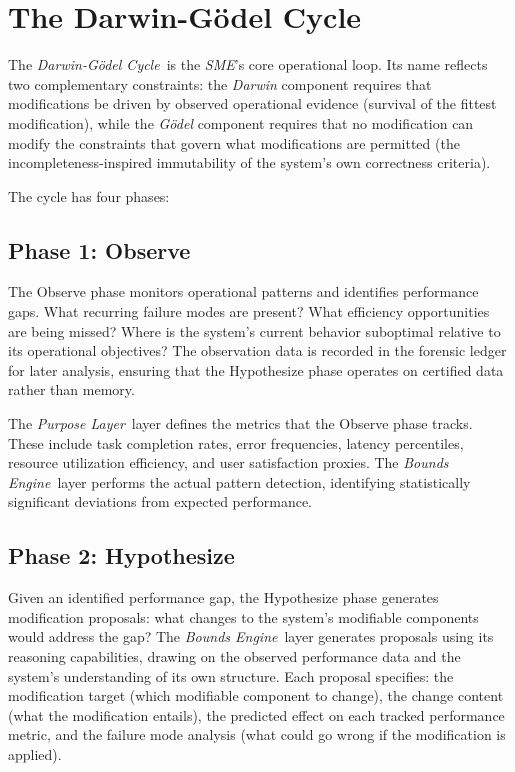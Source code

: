 \documentclass[12pt]{article}
\newcommand{\purpose}{\textit{Purpose Layer}}
\newcommand{\bounds}{\textit{Bounds Engine}}
\newcommand{\sme}{\textit{SME}}
\newcommand{\dgcycle}{\textit{Darwin-G\"odel Cycle}}
\begin{document}
\section{The Darwin-G\"odel Cycle}
\label{sec:dg-cycle}

The \dgcycle\ is the \sme's core operational loop. Its name reflects two complementary constraints: the \textit{Darwin} component requires that modifications be driven by observed operational evidence (survival of the fittest modification), while the \textit{G\"odel} component requires that no modification can modify the constraints that govern what modifications are permitted (the incompleteness-inspired immutability of the system's own correctness criteria).

The cycle has four phases:

\subsection{Phase 1: Observe}
The Observe phase monitors operational patterns and identifies performance gaps. What recurring failure modes are present? What efficiency opportunities are being missed? Where is the system's current behavior suboptimal relative to its operational objectives? The observation data is recorded in the forensic ledger for later analysis, ensuring that the Hypothesize phase operates on certified data rather than memory.

The \purpose\ layer defines the metrics that the Observe phase tracks. These include task completion rates, error frequencies, latency percentiles, resource utilization efficiency, and user satisfaction proxies. The \bounds\ layer performs the actual pattern detection, identifying statistically significant deviations from expected performance.

\subsection{Phase 2: Hypothesize}
Given an identified performance gap, the Hypothesize phase generates modification proposals: what changes to the system's modifiable components would address the gap? The \bounds\ layer generates proposals using its reasoning capabilities, drawing on the observed performance data and the system's understanding of its own structure. Each proposal specifies: the modification target (which modifiable component to change), the change content (what the modification entails), the predicted effect on each tracked performance metric, and the failure mode analysis (what could go wrong if the modification is applied).
\end{document}
